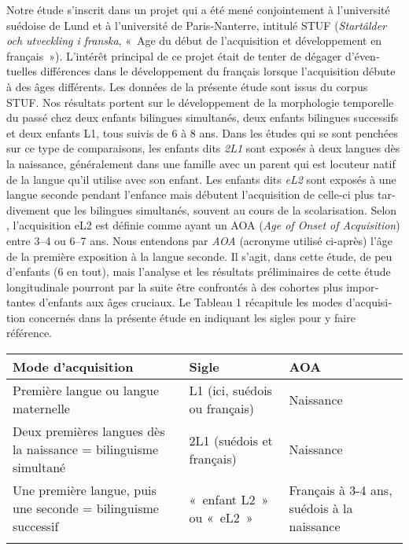 \documentclass[french, output=paper]{langscibook}
\begin{document}
\begin{otherlanguage}{french}
Notre étude s’inscrit dans un projet qui a été mené conjointement à l’université suédoise de Lund et à l’université de Paris-Nanterre, intitulé STUF (\textit{Startâlder och utveckling i franska}, «~Age du début de l’acquisition et développement en français~»). L’intérêt principal de ce projet était de tenter de dégager d’éventuelles différences dans le développement du français lorsque l’acquisition débute à des âges différents. Les données de la présente étude sont issus du corpus STUF. Nos résultats portent sur le développement de la morphologie temporelle du passé chez deux enfants bilingues simultanés, deux enfants bilingues successifs et deux enfants L1, tous suivis de 6 à 8 ans. Dans les études qui se sont penchées sur ce type de comparaisons, les enfants dits \textit{2L1} sont exposés à deux langues dès la naissance, généralement dans une famille avec un parent qui est locuteur natif de la langue qu’il utilise avec son enfant. Les enfants dits \textit{eL2} sont exposés à une langue seconde pendant l’enfance mais débutent l’acquisition de celle-ci plus tardivement que les bilingues simultanés, souvent au cours de la scolarisation. Selon \citet{Meisel2009}, l’acquisition eL2 est définie comme ayant un AOA (\textit{Age of Onset of Acquisition}) entre 3–4 ou 6–7 ans. Nous entendons par \textit{AOA} (acronyme utilisé ci-après) l’âge de la première exposition à la langue seconde. Il s’agit, dans cette étude, de peu d’enfants (6 en tout), mais l’analyse et les résultats préliminaires de cette étude longitudinale pourront par la suite être confrontés à des cohortes plus importantes d’enfants aux âges cruciaux. Le Tableau 1 récapitule les modes d’acquisition concernés dans la présente étude en indiquant les sigles pour y faire référence.

\begin{table}
\begin{tabularx}{\textwidth}{>{\raggedright\arraybackslash}p{}QQ}

\lsptoprule

Mode d’acquisition & Sigle & AOA \\
\midrule
Première langue ou langue maternelle & L1 (ici, suédois ou français) & Naissance\\
\tablevspace
Deux premières langues dès la naissance = bilinguisme simultané & 2L1 (suédois et français) & Naissance\\
\tablevspace
Une première langue, puis une seconde = bilinguisme successif & «~enfant L2~» ou «~eL2~» & Français à 3-4 ans, suédois à la naissance\\
\lspbottomrule
\end{tabularx}


\end{table}
\end{otherlanguage}
\end{document}
